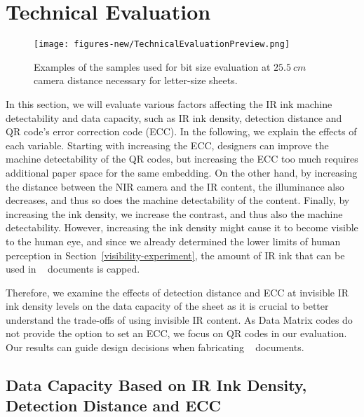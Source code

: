 \section{Technical Evaluation}
\label{EvaluationDataEmbedding}


\begin{figure*}[t]
  \centering
  \texttt{[image: figures-new/TechnicalEvaluationPreview.png]}
  \caption{Examples of the samples used for bit size evaluation at $25.5~cm$ camera distance necessary for letter-size sheets.}
\label{fig:TechnicalEvaluationPreview}
\end{figure*}




In this section, we will evaluate various factors affecting the IR ink machine detectability and data capacity, such as IR ink density, detection distance and QR code's error correction code (ECC). In the following, we explain the effects of each variable. 
Starting with increasing the ECC, designers can improve the machine detectability of the QR codes, but increasing the ECC too much requires additional paper space for the same embedding.
On the other hand, by increasing the distance between the NIR camera and the IR content, the illuminance also decreases, and thus so does the machine detectability of the content.
Finally, by increasing the ink density, we increase the contrast, and thus also the machine detectability.
However, increasing the ink density might cause it to become visible to the human eye, and since we already determined the lower limits of human perception in Section~\ref{visibility-experiment}, the amount of IR ink that can be used in  \systemName~ documents is capped.

Therefore, we examine the effects of detection distance and ECC at invisible IR ink density levels on the data capacity of the sheet as it is crucial to better understand the trade-offs of using invisible IR content.
As Data Matrix codes do not provide the option to set an ECC, we focus on QR codes in our evaluation. Our results can guide design decisions when fabricating \systemName~ documents. 




\subsection{Data Capacity Based on IR Ink Density, Detection Distance and ECC}
\label{DetectionDistanceCapacity}

